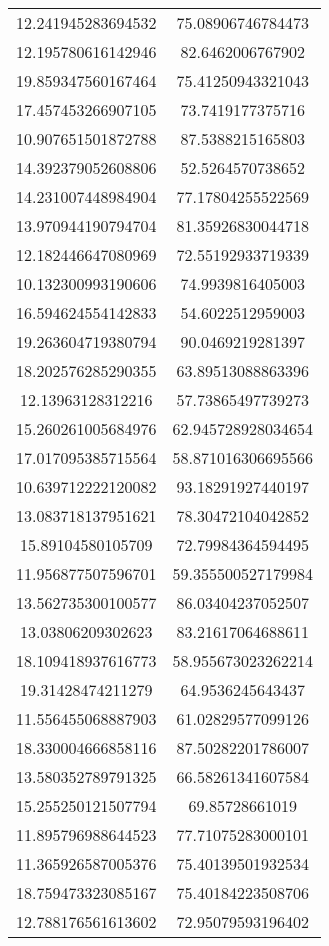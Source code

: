 \begin{table}
\begin{tabular}{cc}
12.241945283694532 & 75.08906746784473 \\
12.195780616142946 & 82.6462006767902 \\
19.859347560167464 & 75.41250943321043 \\
17.457453266907105 & 73.7419177375716 \\
10.907651501872788 & 87.5388215165803 \\
14.392379052608806 & 52.5264570738652 \\
14.231007448984904 & 77.17804255522569 \\
13.970944190794704 & 81.35926830044718 \\
12.182446647080969 & 72.55192933719339 \\
10.132300993190606 & 74.9939816405003 \\
16.594624554142833 & 54.6022512959003 \\
19.263604719380794 & 90.0469219281397 \\
18.202576285290355 & 63.89513088863396 \\
12.13963128312216 & 57.73865497739273 \\
15.260261005684976 & 62.945728928034654 \\
17.017095385715564 & 58.871016306695566 \\
10.639712222120082 & 93.18291927440197 \\
13.083718137951621 & 78.30472104042852 \\
15.89104580105709 & 72.79984364594495 \\
11.956877507596701 & 59.355500527179984 \\
13.562735300100577 & 86.03404237052507 \\
13.03806209302623 & 83.21617064688611 \\
18.109418937616773 & 58.955673023262214 \\
19.31428474211279 & 64.9536245643437 \\
11.556455068887903 & 61.02829577099126 \\
18.330004666858116 & 87.50282201786007 \\
13.580352789791325 & 66.58261341607584 \\
15.255250121507794 & 69.85728661019 \\
11.895796988644523 & 77.71075283000101 \\
11.365926587005376 & 75.40139501932534 \\
18.759473323085167 & 75.40184223508706 \\
12.788176561613602 & 72.95079593196402 \\

\end{tabular}
\end{table}
